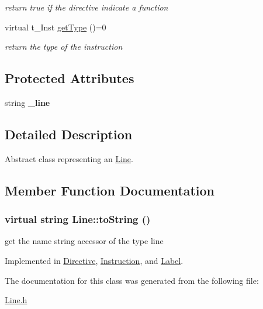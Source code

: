\begin{DoxyCompactItemize}
\begin{DoxyCompactList}\small\item\em return true if the directive indicate a function \item\end{DoxyCompactList}\item 
\hypertarget{classLine_a8673983ef23628b80ea1e4d0a14ce53e}{
virtual t\_\-Inst \hyperlink{classLine_a8673983ef23628b80ea1e4d0a14ce53e}{getType} ()=0}
\label{classLine_a8673983ef23628b80ea1e4d0a14ce53e}

\begin{DoxyCompactList}\small\item\em return the type of the instruction \item\end{DoxyCompactList}\end{DoxyCompactItemize}
\subsection*{Protected Attributes}
\begin{DoxyCompactItemize}
\item 
\hypertarget{classLine_a41059923f5c8e5a0f4f44d84bd8762aa}{
string {\bfseries \_\-line}}
\label{classLine_a41059923f5c8e5a0f4f44d84bd8762aa}

\end{DoxyCompactItemize}


\subsection{Detailed Description}
Abstract class representing an \hyperlink{classLine}{Line}. 

\subsection{Member Function Documentation}
\hypertarget{classLine_a73f822ce0aa9e95bc8fb2caf1a69b245}{
\subsubsection[{toString}]{\setlength{\rightskip}{0pt plus 5cm}virtual string Line::toString ()}}
\label{classLine_a73f822ce0aa9e95bc8fb2caf1a69b245}


get the name string accessor of the type line 

Implemented in \hyperlink{classDirective_a6eeb8fca1505c28a3f54864edb24457c}{Directive}, \hyperlink{classInstruction_ad892da43543a6b385962a4992fbc76b5}{Instruction}, and \hyperlink{classLabel_a2bf18281612263a76e02a9d1f3e3a009}{Label}.

The documentation for this class was generated from the following file:\begin{DoxyCompactItemize}
\item 
\hyperlink{Line_8h}{Line.h}\end{DoxyCompactItemize}
